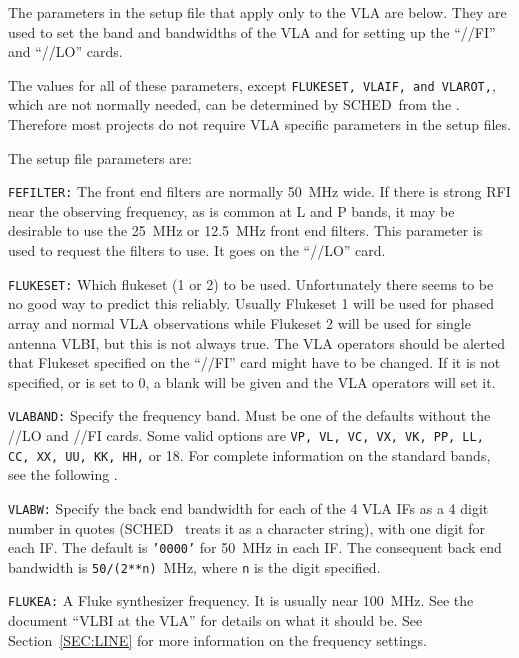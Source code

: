 \documentclass{report}
\newcommand{\schedb}{{\sc SCHED~}}
\begin{document}
The parameters in the setup file that apply only to the VLA are
below. They are used to set the band and bandwidths of the VLA and
for setting up the ``//FI'' and ``//LO''  cards.

The values for all of these parameters, except {\tt FLUKESET, VLAIF,
and VLAROT,}, which are not normally needed, can be determined by
\schedb from the .  Therefore
most projects do not require VLA specific parameters in the setup
files.

The setup file parameters are:

\begin{list}{}{\parsep 0em  \itemsep 0em }

\item {\tt FEFILTER:} The front end filters are
normally 50~MHz wide. If there is strong RFI near the observing
frequency, as is common at L and P bands, it may be desirable to use
the 25~MHz or 12.5~MHz front end filters. This parameter is used to
request the filters to use. It goes on the ``//LO'' card.

\item {\tt FLUKESET:} Which flukeset (1 or 2)
to be used. Unfortunately there seems to be no good way to predict
this reliably. Usually Flukeset 1 will be used for phased array and
normal VLA observations while Flukeset 2 will be used for single
antenna VLBI, but this is not always true. The VLA operators should be
alerted that Flukeset specified on the ``//FI'' card might have to be
changed. If it is not specified, or is set to 0, a blank will be given
and the VLA operators will set it.

\item {\tt VLABAND:} Specify the frequency band.
Must be one of the defaults without the //LO and //FI cards.  Some
valid options are {\tt VP, VL, VC, VX, VK, PP, LL, CC, XX, UU, KK,
HH,} or 18.  For complete information on the standard bands, see
the following .

\item {\tt VLABW:} Specify the back end bandwidth
for each of the 4 VLA IFs as a 4 digit number in quotes (\schedb
treats it as a character string), with one digit for each IF. The
default is {\tt '0000'} for 50~MHz in each IF. The consequent back end
bandwidth is {\tt 50/(2**n)}~MHz, where {\tt n} is the digit
specified.

\item {\tt FLUKEA:} A Fluke synthesizer frequency.
It is usually near 100~MHz. See the document ``VLBI at the VLA'' for
details on what it should be. See Section~\ref{SEC:LINE} for more
information on the frequency settings.


\end{list}
\end{document}
